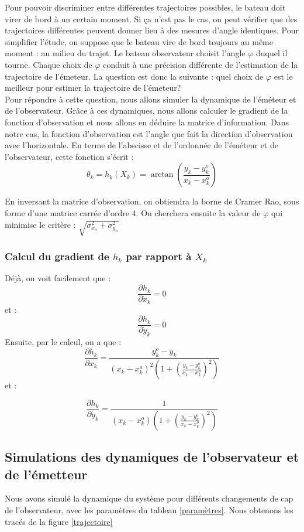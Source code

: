 \documentclass{article}
\begin{document}
Pour pouvoir discriminer entre différentes
trajectoires possibles, le bateau doit virer de bord à un certain moment. Si ça n'est pas le cas, on peut vérifier que des trajectoires différentes peuvent donner lieu à des mesures d'angle identiques.
Pour simplifier l'étude, on suppose que le bateau vire de bord toujours au même moment : au milieu du trajet. Le bateau observateur choisit l'angle $\varphi $ duquel il tourne. Chaque choix de $\varphi$ 
conduit à une précision différente de l'estimation de la trajectoire  de l'émeteur.
La question est donc la suivante : quel choix de $\varphi$ est le meilleur pour estimer la trajectoire de l'émeteur?
\\
Pour répondre à cette question, nous allons simuler la dynamique de l'éméteur et de l'observateur. Grâce à ces dynamiques, nous allons
calculer le gradient de la fonction d'observation et nous allons en déduire la matrice d'information.
Dans notre cas, la fonction d'observation est l'angle que fait la direction d'observation avec l'horizontale. 
En terme de l'abscisse et de l'ordonnée de l'éméteur et de l'observateur, cette fonction s'écrit : 
\[\theta_{k} = h_{k}(X_{k})=\arctan \left(\frac{y_{k}-y_{k}^{o}}{x_{k}-x_{k}^{o}}\right)\]

En inversant la matrice d'observation, on obtiendra la borne de Cramer Rao, sous forme d'une matrice carrée d'ordre 4.
On cherchera ensuite la valeur de $\varphi$ qui minimise le critère : $\sqrt{\sigma_{x_{n}}^{2}+\sigma_{y_{n}}^{2}}$

\subsubsection{Calcul du gradient de $h_{k}$ par rapport à $X_{k}$}
Déjà, on voit facilement que : 
\[\frac{\partial h_{k}}{\partial \dot{x}_{k}} = 0 \] et :
\[\frac{\partial h_{k}}{\partial \dot{y}_{k}} = 0 \]
Ensuite, par le calcul, on a que : 
\[\frac{\partial h_{k}}{\partial x_{k}}=\frac{y_{k}^{o}-y_{k}}{\left(x_{k}-x_{k}^{o}\right)^{2}\left(1+\left(\frac{y_{k}-y_{k}^{o}}{x_{k}-x_{k}^{o}}\right)^{2}\right)}\]
et :

\[\frac{\partial h_{k}}{\partial y_{k}}= \frac{1}{\left(x_{k}-x_{k}^{o}\right)\left(1+\left( \frac{y_{k}-y_{k}^{o}}{x_{k}-x_{k}^{o}}  \right)^{2}\right)}\]
\subsection{Simulations des dynamiques de l'observateur et de l'émetteur}
Nous avons simulé la dynamique du système pour différents changements de cap de l'observateur, avec les paramètres du tableau \ref{paramètres}.
 Nous obtenons les tracés de la figure \ref{trajectoire}
\end{document}
